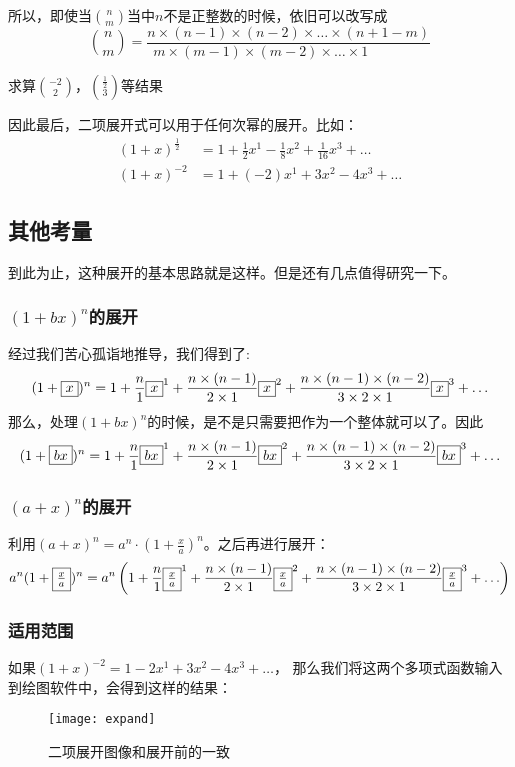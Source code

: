 所以，即使当${n\choose m}$当中$n$不是正整数的时候，依旧可以改写成
\[
	{n\choose m} = \frac{n\times {(n-1)}\times (n-2)\times \ldots \times (n+1-m)}{m\times {(m-1)}\times (m-2)\times \ldots \times1\qquad \qquad} %
\]

\begin{TaskBox}
求算${-2 \choose 2}$，${\frac{1}{2} \choose 3}$等结果
\end{TaskBox}

因此最后，二项展开式可以用于任何次幂的展开。比如：
\begin{align*}
(1+x)^\frac{1}{2} &=1+\frac{1}{2}x^1-\frac{1}{8}x^2+\frac{1}{16}x^3+\ldots\\
(1+x)^{-2} &=1+(-2)x^1+3x^2-4x^3+\ldots
\end{align*}


\subsection*{其他考量}
到此为止，这种展开的基本思路就是这样。但是还有几点值得研究一下。
\subsubsection*{$(1+bx)^n$的展开}
经过我们苦心孤诣地推导，我们得到了:
\[
	(1+\fbox{$x$})^n = 1+\frac{n}{1}\fbox{$x$}^1+\frac{n\times (n-1)}{2\times 1}\fbox{$x$}^2+\frac{n\times (n-1)\times (n-2)}{3\times2\times 1}\fbox{$x$}^3+\ldots
\]
那么，处理$(1+bx)^n$的时候，是不是只需要把作为一个整体就可以了。因此
\[
	(1+\fbox{$bx$})^n = 1+\frac{n}{1}\fbox{$bx$}^1+\frac{n\times (n-1)}{2\times 1}\fbox{$bx$}^2+\frac{n\times (n-1)\times (n-2)}{3\times2\times 1}\fbox{$bx$}^3+\ldots
\]

\subsubsection*{$(a+x)^n$的展开}
利用$(a+x)^n=a^n\cdot (1+\frac{x}{a})^n$。之后再进行展开：
\[
	a^n(1+\fbox{$\frac{x}{a}$})^n =a^n\left( 1+\frac{n}{1}\fbox{$\frac{x}{a}$}^1+\frac{n\times (n-1)}{2\times 1}\fbox{$\frac{x}{a}$}^2+\frac{n\times (n-1)\times (n-2)}{3\times2\times 1}\fbox{$\frac{x}{a}$}^3+\ldots\right)
\]

\subsubsection*{适用范围}
如果$(1+x)^{-2} =1-2x^1+3x^2-4x^3+\ldots$，
那么我们将这两个多项式函数输入到绘图软件中，会得到这样的结果：
\begin{figure}[H]
\centering
\texttt{[image: expand]}
\caption{二项展开图像和展开前的一致}
\end{figure}

